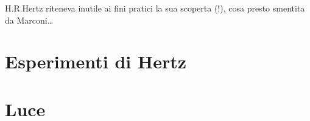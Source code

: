\documentclass[letterpaper,10pt,italian]{jupyterBook}
\begin{document}
\sphinxAtStartPar
{}  H.R.Hertz riteneva inutile ai fini pratici la sua scoperta (!), cosa presto smentita da Marconi…

\sphinxAtStartPar
{}  


\section{Esperimenti di Hertz}
\label{\detokenize{ch/electromagnetism/em-waves:esperimenti-di-hertz}}\label{\detokenize{ch/electromagnetism/em-waves:physics-hs-electromagnetism-em-waves-hertz}}

\section{Luce}
\label{\detokenize{ch/electromagnetism/em-waves:luce}}\label{\detokenize{ch/electromagnetism/em-waves:physics-hs-electromagnetism-em-waves-light}}
\end{document}
